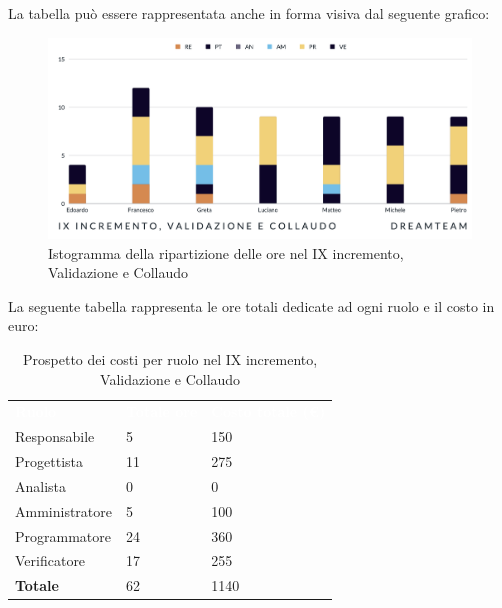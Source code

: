 La tabella può essere rappresentata anche in forma visiva dal seguente grafico:
\begin{figure}[H]
\centering
\includegraphics[scale=0.50]{Sezioni/SezioniPreventivo/grafici/validazione/Validazione_IX_incremento.png}
\caption{Istogramma della ripartizione delle ore nel IX incremento, Validazione e Collaudo}
\end{figure}

La seguente tabella rappresenta le ore totali dedicate ad ogni ruolo e il costo in euro:

\begin{table}[H]
\begin{center}
\renewcommand{\arraystretch}{1.5}
\begin{tabular}{ m{}<{\centering}  m{}<{\centering} m{}<{\centering}}
	\rowcolor{darkblue}
	\textcolor{white}{\textbf{Ruolo}}&\textcolor{white}{\textbf{Totale ore}}&\textcolor{white}{\textbf{Costo totale (\euro)}}\\ 

	Responsabile  & 5 & 150 \\	
	
	Progettista & 11 & 275 \\
	
	Analista & 0 & 0 \\

	Amministratore & 5 & 100 \\
	
	Programmatore & 24 & 360 \\
	
	Verificatore & 17 & 255 \\
	
	\textbf{Totale} & 62 & 1140 \\
	
\end{tabular}
\caption{Prospetto dei costi per ruolo nel IX incremento, Validazione e Collaudo}
\end{center}
\end{table}

